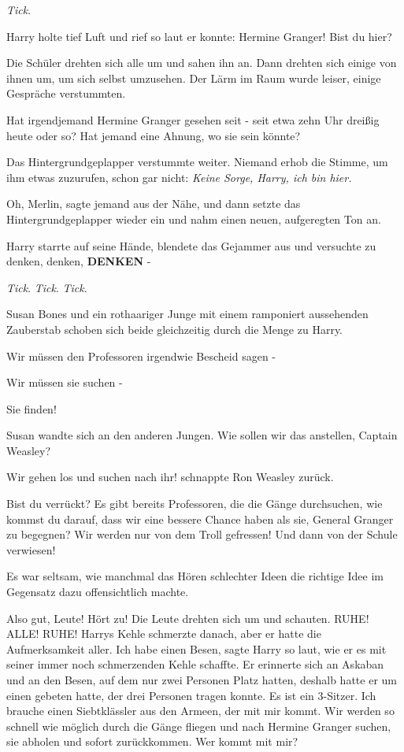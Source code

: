 \emph{Tick}.

Harry holte tief Luft und rief so laut er konnte: \glqq{}Hermine Granger! Bist du
hier?\grqq{}

Die Schüler drehten sich alle um und sahen ihn an. Dann drehten sich einige von
ihnen um, um sich selbst umzusehen. Der Lärm im Raum wurde leiser, einige
Gespräche verstummten.

\glqq{}Hat irgendjemand Hermine Granger gesehen seit - seit etwa zehn Uhr dreißig
heute oder so? Hat jemand eine Ahnung, wo sie sein könnte?\grqq{}

Das Hintergrundgeplapper verstummte weiter. Niemand erhob die Stimme, um ihm
etwas zuzurufen, schon gar nicht: \glqq{}\emph{Keine Sorge, Harry, ich bin hier.}

\glqq{}Oh, Merlin\grqq{}, sagte jemand aus der Nähe, und dann setzte das
Hintergrundgeplapper wieder ein und nahm einen neuen, aufgeregten Ton an.

Harry starrte auf seine Hände, blendete das Gejammer aus und versuchte zu
denken, denken, \textbf{DENKEN} -

\emph{Tick}. \emph{Tick}. \emph{Tick}.

Susan Bones und ein rothaariger Junge mit einem ramponiert aussehenden
Zauberstab schoben sich beide gleichzeitig durch die Menge zu Harry.

\glqq{}Wir müssen den Professoren irgendwie Bescheid sagen -\grqq{}

\glqq{}Wir müssen sie suchen -\grqq{}

\glqq{}Sie finden!\grqq{}

Susan wandte sich an den anderen Jungen. \glqq{}Wie sollen wir das anstellen,
Captain Weasley?\grqq{}

\glqq{}Wir gehen los und suchen nach ihr!\grqq{} schnappte Ron Weasley zurück.

\glqq{}Bist du verrückt? Es gibt bereits Professoren, die die Gänge durchsuchen,
wie kommst du darauf, dass wir eine bessere Chance haben als sie, General
Granger zu begegnen? Wir werden nur von dem Troll gefressen! Und dann von der
Schule verwiesen!\grqq{}

Es war seltsam, wie manchmal das Hören schlechter Ideen die richtige Idee im
Gegensatz dazu offensichtlich machte.

\glqq{}Also gut, Leute! Hört zu!\grqq{} Die Leute drehten sich um und schauten.
\glqq{}RUHE! ALLE! RUHE!\grqq{} Harrys Kehle schmerzte danach, aber er hatte die
Aufmerksamkeit aller. \glqq{}Ich habe einen Besen\grqq{}, sagte Harry so laut,
wie er es mit seiner immer noch schmerzenden Kehle schaffte. Er erinnerte sich
an Askaban und an den Besen, auf dem nur zwei Personen Platz hatten, deshalb
hatte er um einen gebeten hatte, der drei Personen tragen konnte. \glqq{}Es ist
ein 3-Sitzer. Ich brauche einen Siebtklässler aus den Armeen, der mit mir kommt.
Wir werden so schnell wie möglich durch die Gänge fliegen und nach Hermine
Granger suchen, sie abholen und sofort zurückkommen. Wer kommt mit mir?\grqq{}

